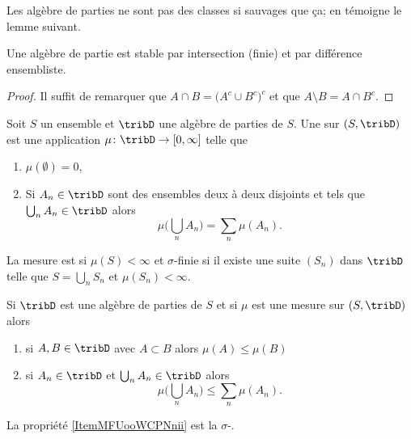 Les algèbre de parties ne sont pas des classes si sauvages que ça; en témoigne le lemme suivant.
\begin{lemma}   \label{LemBFKootqXKl}
    Une algèbre de partie est stable par intersection (finie) et par différence ensembliste.
\end{lemma}

\begin{proof}
    Il suffit de remarquer que \( A\cap B=\big( A^c\cup B^c \big)^c\) et que \( A\setminus B=A\cap B^c\).
\end{proof}

\begin{definition}
    Soit \( S\) un ensemble et \( \tribD\) une algèbre de parties de \( S\). Une  sur \( (S,\tribD)\) est une application \( \mu\colon \tribD\to \mathopen[ 0 , \infty \mathclose]\) telle que
    \begin{enumerate}
        \item
            \( \mu(\emptyset)=0\),
        \item
            Si \( A_n\in\tribD\) sont des ensembles deux à deux disjoints et tels que \( \bigcup_nA_n\in\tribD\) alors
            \begin{equation}
                \mu\big( \bigcup_nA_n \big)=\sum_n\mu(A_n).
            \end{equation}
    \end{enumerate}

    La mesure est  si \( \mu(S)<\infty\) et \( \sigma\)-finie si il existe une suite \( (S_n)\) dans \( \tribD\) telle que \( S=\bigcup_nS_n\) et \( \mu(S_n)<\infty\).
\end{definition}

\begin{lemma}  \label{LemZQUooMdCpq}
    Si \( \tribD\) est une algèbre de parties de \( S\) et si \( \mu\) est une mesure sur \( (S,\tribD)\) alors
    \begin{enumerate}
        \item
            si \( A,B\in\tribD\) avec \( A\subset B\) alors \( \mu(A)\leq \mu(B)\)
        \item   \label{ItemMFUooWCPNnii}
            si \( A_n\in\tribD\) et \( \bigcup_nA_n\in\tribD\) alors
            \begin{equation}
                \mu\big( \bigcup_nA_n \big)\leq\sum_n\mu(A_n).
            \end{equation}
    \end{enumerate}
\end{lemma}
La propriété \ref{ItemMFUooWCPNnii} est la \( \sigma\)-.

